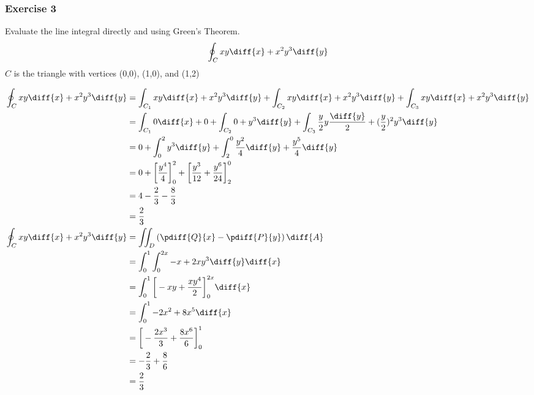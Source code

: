 \documentclass{math}
\begin{document}
\subsubsection*{Exercise 3}
Evaluate the line integral directly and using Green's Theorem.
\[ \oint_{C}xy\diff{x}+x^2y^3\diff{y} \]
\( C \) is the triangle with vertices (0,0), (1,0), and (1,2)
\begin{center}
\end{center}
\begin{align*}
  \oint_{C}xy\diff{x}+x^2y^3\diff{y} &=
    \int_{C_1}xy\diff{x}+x^2y^3\diff{y}+
    \int_{C_2}xy\diff{x}+x^2y^3\diff{y}+
    \int_{C_3}xy\diff{x}+x^2y^3\diff{y} \\
  &= \int_{C_1}0\diff{x}+0+
    \int_{C_2}0+y^3\diff{y}+
    \int_{C_3}\frac{y}{2}y\frac{\diff{y}}{2}+(\frac{y}{2})^2y^3\diff{y} \\
  &= 0+\int_{0}^{2}y^3\diff{y}+
    \int_{2}^{0}\frac{y^2}{4}\diff{y}+\frac{y^5}{4}\diff{y} \\
  &= 0+\bigg[\frac{y^4}{4}\bigg]_{0}^{2}+
    \bigg[\frac{y^3}{12}+\frac{y^6}{24}\bigg]_{2}^{0} \\
  &= 4-\frac{2}{3}-\frac{8}{3} \\
  &= \frac{2}{3} \\
  \oint_{C}xy\diff{x}+x^2y^3\diff{y} &=
    \iint_{D}\left(\pdiff{Q}{x}-\pdiff{P}{y}\right)\diff{A} \\
  &= \int_{0}^{1}\int_{0}^{2x}-x+2xy^3\diff{y}\diff{x} \\
  &= \int_{0}^{1}\bigg[-xy+\frac{xy^4}{2}\bigg]_{0}^{2x}\diff{x} \\
  &= \int_{0}^{1}-2x^2+8x^5\diff{x} \\
  &= \bigg[-\frac{2x^3}{3}+\frac{8x^6}{6}\bigg]_{0}^{1} \\
  &= -\frac{2}{3}+\frac{8}{6} \\
  &= \frac{2}{3}
\end{align*}
\end{document}
